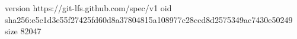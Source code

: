version https://git-lfs.github.com/spec/v1
oid sha256:e5c1d3e55f27425fd60d8a37804815a108977c28ccd8d2575349ac7430e50249
size 82047
